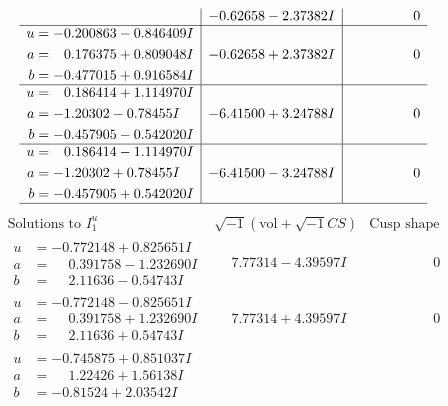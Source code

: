 \documentclass[1p]{elsarticle_modified}
\theoremstyle{definition}
\newcommand{\I}{\sqrt{-1}}
\begin{document}
$$\begin{array}{c|c|c}
 & -0.62658 - 2.37382 I & \phantom{-0.000000 } 0 \\ \hline\begin{aligned}
u &= -0.200863 - 0.846409 I \\
a &= \phantom{-}0.176375 + 0.809048 I \\
b &= -0.477015 + 0.916584 I\end{aligned}
 & -0.62658 + 2.37382 I & \phantom{-0.000000 } 0 \\ \hline\begin{aligned}
u &= \phantom{-}0.186414 + 1.114970 I \\
a &= -1.20302 - 0.78455 I \\
b &= -0.457905 - 0.542020 I\end{aligned}
 & -6.41500 + 3.24788 I & \phantom{-0.000000 } 0 \\ \hline\begin{aligned}
u &= \phantom{-}0.186414 - 1.114970 I \\
a &= -1.20302 + 0.78455 I \\
b &= -0.457905 + 0.542020 I\end{aligned}
 & -6.41500 - 3.24788 I & \phantom{-0.000000 } 0\\
 \hline 
 \end{array}$$\newpage$$\begin{array}{c|c|c}  
\text{Solutions to }I^u_{1}& \I (\text{vol} + \sqrt{-1}CS) & \text{Cusp shape}\\
 \hline 
\begin{aligned}
u &= -0.772148 + 0.825651 I \\
a &= \phantom{-}0.391758 - 1.232690 I \\
b &= \phantom{-}2.11636 - 0.54743 I\end{aligned}
 & \phantom{-}7.77314 - 4.39597 I & \phantom{-0.000000 } 0 \\ \hline\begin{aligned}
u &= -0.772148 - 0.825651 I \\
a &= \phantom{-}0.391758 + 1.232690 I \\
b &= \phantom{-}2.11636 + 0.54743 I\end{aligned}
 & \phantom{-}7.77314 + 4.39597 I & \phantom{-0.000000 } 0 \\ \hline\begin{aligned}
u &= -0.745875 + 0.851037 I \\
a &= \phantom{-}1.22426 + 1.56138 I \\
b &= -0.81524 + 2.03542 I\end{aligned}

\end{array}$$
\end{document}

